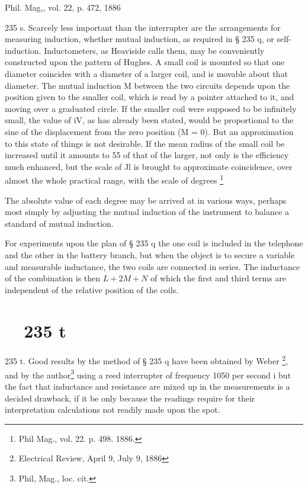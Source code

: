 Phil. Mag,, vol. 22, p. 472, 1886

235 s. Scarcely less important than the interrupter are the arrangements for
measuring induction, whether mutual induction, as required in § 235 q, or
self-induction. Inductometers, as Heaviside calls them, may be conveniently
constructed upon the pattern of Hughes. A small coil is mounted so that one
diameter coincides with a diameter of a larger coil, and is movable about that
diameter. The mutual induction M between the two circuits depends upon the
position given to the smaller coil, which is read by a pointer attached to it,
and moving over a graduated circle. If the smaller coil were supposed to be
infinitely small, the value of iV, as has already been stated, would be
proportional to the sine of the displacement from the zero position (M = 0).
But an approximation to this state of things is not desirable. If the mean
radius of the small coil be increased until it amounts to 55 of that of the
larger, not only is the efficiency much enhanced, but the scale of Jl is
brought to approximate coincidence, over almost the whole practical range, with
the scale of degrees \footnote{Phil Mag., vol. 22. p. 498. 1886.}

The absolute value of each degree may be arrived at in
various ways, perhaps most simply by adjusting the mutual induction of the
instrument to balance a standard of mutual induction.

For experiments upon the plan of § 235 q the one coil is included in the
telephone and the other in the battery branch, but when the object is to secure
a variable and measurable inductance, the two coils are connected in series.
The inductance of the combination is then \(L+2M+N\) of which the first and
third terms are independent of the relative position of the coils.

\section{~~235 t}
235 t. Good results by the method of § 235 q have been obtained by Weber
\footnote{Electrical Review, April 9, July 9, 1886}, and by
the author\footnote{Phil, Mag., loc. cit.}
using a reed interrupter of frequency 1050 per second i but the fact
that inductance and resistance are mixed up in the measurements is a decided
drawback, if it be only because the readings require for their interpretation
calculations not readily made upon the spot.

